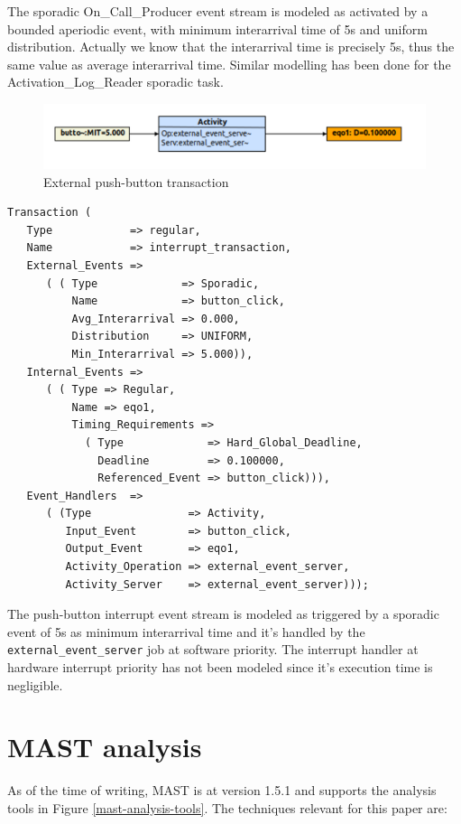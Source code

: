\documentclass{article}
\begin{document}
The sporadic On\_Call\_Producer event stream is modeled as activated by a bounded aperiodic event, with minimum interarrival time of 5s and uniform distribution. Actually we know that the interarrival time is precisely 5s, thus the same value as average interarrival time. Similar modelling has been done for the Activation\_Log\_Reader sporadic task.

\begin{figure}[!htbp]
\centering
\includegraphics[width=6in]{images/transaction-eq}
\caption{External push-button transaction}
\label{transaction-eq}
\end{figure}

\begin{lstlisting}
Transaction (
   Type            => regular,
   Name            => interrupt_transaction,
   External_Events =>
      ( ( Type             => Sporadic,
          Name             => button_click,
          Avg_Interarrival => 0.000,
          Distribution     => UNIFORM,
          Min_Interarrival => 5.000)),
   Internal_Events =>
      ( ( Type => Regular,
          Name => eqo1,
          Timing_Requirements =>
            ( Type             => Hard_Global_Deadline,
              Deadline         => 0.100000,
              Referenced_Event => button_click))),
   Event_Handlers  =>
      ( (Type               => Activity,
         Input_Event        => button_click,
         Output_Event       => eqo1,
         Activity_Operation => external_event_server,
         Activity_Server    => external_event_server)));
\end{lstlisting}

The push-button interrupt event stream is modeled as triggered by a sporadic event of 5s as minimum interarrival time and it's handled by the \texttt{external\_event\_server} job at software priority. The interrupt handler at hardware interrupt priority has not been modeled since it's execution time is negligible.

\section{MAST analysis}

As of the time of writing, MAST is at version 1.5.1 and supports the analysis tools \cite{mast-analysis} in Figure \ref{mast-analysis-tools}. The techniques relevant for this paper are:
\end{document}
